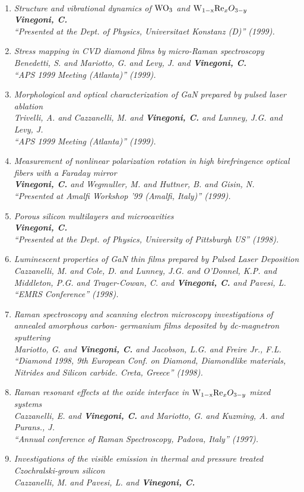 \documentclass{resume}
\begin{document}
\begin{category}{~~}
\begin{enumerate}
\item \it Structure and vibrational dynamics of $\ce{WO_3}$ and $\ce{W_{{1-x}}Re_{x}}{O_{{3-y}}}$
\\ {\bf Vinegoni, C.} \\ ``Presented at the Dept. of Physics, Universitaet Konstanz (D)''  (1999). 

\item \it Stress mapping in CVD diamond films by micro-Raman spectroscopy \\ Benedetti, S. and Mariotto, G. and Levy, J. and {\bf Vinegoni, C.} \\ ``APS 1999 Meeting (Atlanta)''  (1999). 




\item \it Morphological and optical characterization of GaN prepared by pulsed laser ablation \\ Trivelli, A. and Cazzanelli, M. and {\bf Vinegoni, C.} and Lunney, J.G. and Levy, J. \\ ``APS 1999 Meeting (Atlanta)''  (1999). \item \it Measurement of nonlinear polarization rotation in high birefringence optical fibers with a Faraday mirror \\ {\bf Vinegoni, C.} and Wegmuller, M. and Huttner, B. and Gisin, N. \\ ``Presented at Amalfi Workshop ’99 (Amalfi, Italy)''  (1999). \item \it Porous silicon multilayers and microcavities \\ {\bf Vinegoni, C.} \\ ``Presented at the Dept. of Physics, University of Pittsburgh US''  (1998). \item \it Luminescent properties of GaN thin films prepared by Pulsed Laser Deposition \\ Cazzanelli, M. and Cole, D. and Lunney, J.G. and O'Donnel, K.P. and Middleton, P.G. and Trager-Cowan, C. and {\bf Vinegoni, C.} and Pavesi, L. \\ ``EMRS Conference''  (1998). \item \it Raman spectroscopy and scanning electron microscopy investigations of annealed amorphous carbon- germanium films deposited by dc-magnetron sputtering \\ Mariotto, G. and {\bf Vinegoni, C.} and Jacobson, L.G. and Freire Jr., F.L. \\ ``Diamond 1998, 9th European Conf. on Diamond, Diamondlike materials, Nitrides and Silicon carbide. Creta, Greece''  (1998). \item \it Raman resonant effects at the oxide interface in $\ce{W_{{1-x}}Re_{x}}{O_{{3-y}}}$ mixed systems \\ Cazzanelli, E. and {\bf Vinegoni, C.} and Mariotto, G. and Kuzming, A. and Purans., J. \\ ``Annual conference of Raman Spectroscopy, Padova, Italy''  (1997). \item \it Investigations of the visible emission in thermal and pressure treated Czochralski-grown silicon \\ Cazzanelli, M. and Pavesi, L. and {\bf Vinegoni, C.} 
\end{enumerate}
\end{category}
\end{document}
